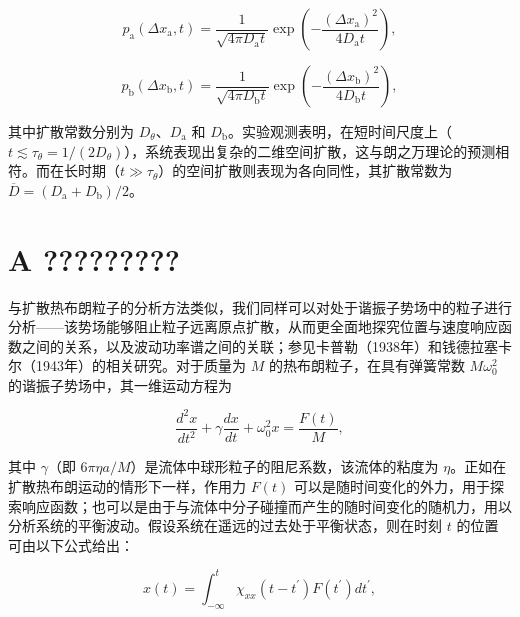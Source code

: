 \begin{equation}\tag{15.3.33}\label{eq:15.3.33}
p _ { \mathrm { a } } ( \Delta x _ { \mathrm { a } } , t ) = \frac { 1 } { \sqrt { 4 \pi D _ { \mathrm { a } } t } } \exp \left( - \frac { ( \Delta x _ { \mathrm { a } } ) ^{2} } { 4 D _ { \mathrm { a } } t } \right) ,
\end{equation}

\begin{equation}\tag{15.3.34}\label{eq:15.3.34}
p _ { \mathrm { b } } ( \Delta x _ { \mathrm { b } } , t ) = \frac { 1 } { \sqrt { 4 \pi D _ { \mathrm { b } } t } } \exp \left( - \frac { ( \Delta x _ { \mathrm { b } } ) ^{2} } { 4 D _ { \mathrm { b } } t } \right) ,
\end{equation}

其中扩散常数分别为 \(D_{\theta}\)、\(D_{\mathrm{a}}\) 和 \(D_{\mathrm{b}}\)。实验观测表明，在短时间尺度上（\(t\lesssim\tau_{\theta}=1/(2D_{\theta})\)），系统表现出复杂的二维空间扩散，这与朗之万理论的预测相符。而在长时期（\(t\gg\tau_{\theta}\)）的空间扩散则表现为各向同性，其扩散常数为 \(\overline{D}=(D_{\mathrm{a}}+D_{\mathrm{b}})/2\)。

\section{A ?????????}\label{a-ux8c10ux632fux5b50ux7684ux70edux5e03ux6717ux8fd0ux52a8}

与扩散热布朗粒子的分析方法类似，我们同样可以对处于谐振子势场中的粒子进行分析------该势场能够阻止粒子远离原点扩散，从而更全面地探究位置与速度响应函数之间的关系，以及波动功率谱之间的关联；参见卡普勒（1938年）和钱德拉塞卡尔（1943年）的相关研究。对于质量为 \(M\) 的热布朗粒子，在具有弹簧常数 \(M\omega_{0}^{2}\) 的谐振子势场中，其一维运动方程为

\begin{equation}\tag{15.3.35}\label{eq:15.3.35}
\frac { d ^{2} x } { d t ^{2} } + \gamma \frac { d x } { d t } + \omega _ { 0 } ^{2} x = \frac { F ( t ) } { M } ,
\end{equation}

其中 \(\gamma\)（即 \(6\pi\eta a/M\)）是流体中球形粒子的阻尼系数，该流体的粘度为 \(\eta\)。正如在扩散热布朗运动的情形下一样，作用力 \(F(t)\) 可以是随时间变化的外力，用于探索响应函数；也可以是由于与流体中分子碰撞而产生的随时间变化的随机力，用以分析系统的平衡波动。假设系统在遥远的过去处于平衡状态，则在时刻 \(t\) 的位置可由以下公式给出：

\begin{equation}\tag{15.3.36}\label{eq:15.3.36}
x ( t ) = \int _ { - \infty } ^{t} \chi _ { x x } ( t - t ^{\prime} ) F ( t ^{\prime} ) d t ^{\prime} ,
\end{equation}

